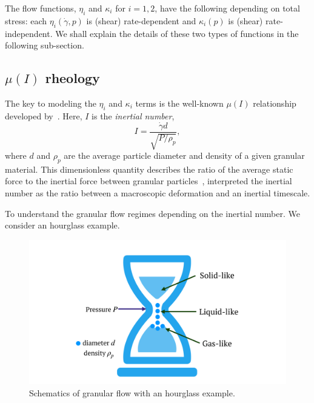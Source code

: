

\par
The flow functions, $\eta_i$ and $\kappa_i$ for $i = 1,2$, have the following depending on total stress: each $\eta_i(\dot{\gamma}, p)$ is (shear) rate-dependent and $\kappa_i (p)$ is (shear) rate-independent. 
We shall explain the details of these two types of functions in the following sub-section.

\subsection{$\mu (I)$ rheology}
The key to modeling the $\eta_i$ and $\kappa_i$ terms is the well-known $\mu(I)$ relationship developed by~\cite{jop_constitutive_2006}.
Here, $I$ is the \textit{inertial number},
\begin{equation}
  I =  \frac{\dot{\gamma} d }{\sqrt{P/\rho_p}},
  \label{eq_inertialI}
\end{equation}
where $d$ and $\rho_p$ are the average particle diameter and density of a given granular material.
This dimensionless quantity describes the ratio of the average static force to the inertial force between granular particles~\cite{jop_constitutive_2006}, interpreted the inertial number as the ratio between a macroscopic deformation and an inertial timescale. 
\par
To understand the granular flow regimes depending on the inertial number. We consider an hourglass example. 
\begin{figure}[ht]
  \begin{center}
    \includegraphics[scale=0.15]{figures/fig_hourglass.pdf}
    \end{center}
  \caption{Schematics of granular flow with an hourglass example.}
  \label{fig_hourglass}
\end{figure}

